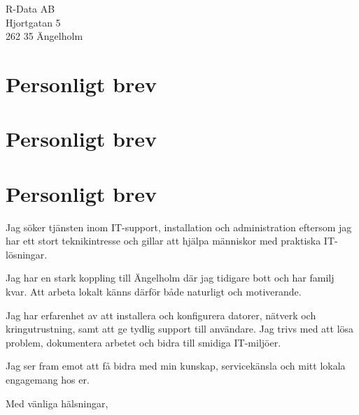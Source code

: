 \documentclass[a4paper,11pt]{letter}
\date{\today}
\begin{document}
\begin{letter}{R-Data AB\\Hjortgatan 5\\262 35 Ängelholm}
\section*{Personligt brev}

\section*{Personligt brev}

\section*{Personligt brev}

Jag söker tjänsten inom IT-support, installation och administration eftersom jag har ett stort teknikintresse och gillar att hjälpa människor med praktiska IT-lösningar.

Jag har en stark koppling till Ängelholm där jag tidigare bott och har familj kvar. Att arbeta lokalt känns därför både naturligt och motiverande.

Jag har erfarenhet av att installera och konfigurera datorer, nätverk och kringutrustning, samt att ge tydlig support till användare. Jag trivs med att lösa problem, dokumentera arbetet och bidra till smidiga IT-miljöer.

Jag ser fram emot att få bidra med min kunskap, servicekänsla och mitt lokala engagemang hos er.


\closing{Med vänliga hälsningar,}

\end{letter}
\end{document}
